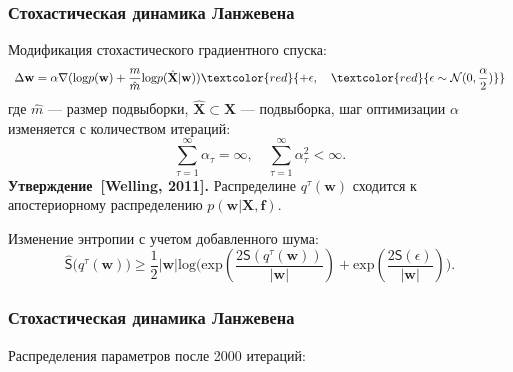 \documentclass[10pt,pdf,utf8,russian,aspectratio=169]{beamer}
\begin{document}
\begin{frame}
\frametitle{Стохастическая динамика Ланжевена}
Модификация стохастического градиентного спуска:
\[
	\Delta \mathbf{w} = \alpha \nabla (\text{log}p(\mathbf{w})+\frac{m}{\hat{m}}\text{log}p(\hat{\mathbf{X}}|\mathbf{w}))  \textcolor{red}{+ \epsilon, \quad   \textcolor{red}{\epsilon \sim  \mathcal{N}({0},{\frac{\alpha}{2}})}}
\]
где $\hat{m}$ --- размер подвыборки,  $\hat{\mathbf{X}} \subset \mathbf{X}$ --- подвыборка, шаг оптимизации $\alpha$ изменяется с количеством итераций:
\[
	\sum_{\tau=1}^\infty \alpha_\tau = \infty, \quad \sum_{\tau=1}^\infty \alpha_\tau^2 < \infty.
\]
\textbf{Утверждение~[Welling, 2011].} Распределине $q^\tau(\mathbf{w})$ сходится к апостериорному распределению $p(\mathbf{w} | \mathbf{X},\mathbf{f})$.


Изменение энтропии с учетом добавленного шума:
\[
\hat{\mathsf{S}}\bigl(q^\tau(\mathbf{w})\bigr)   \geq \frac{1}{2}|\mathbf{w}|\text{log}\bigl(\text{exp}(\frac{2\mathsf{S}(q^\tau(\mathbf{w}))}{|\mathbf{w}|}) + \text{exp}(\frac{2\mathsf{S}( \epsilon)}{|\mathbf{w}|})\bigr).
\]

\end{frame}



\begin{frame}
\frametitle{Стохастическая динамика Ланжевена}
Распределения параметров после 2000 итераций:
\begin{figure}[h]
\centering
{}
\end{figure}

\end{frame}
\end{document}
